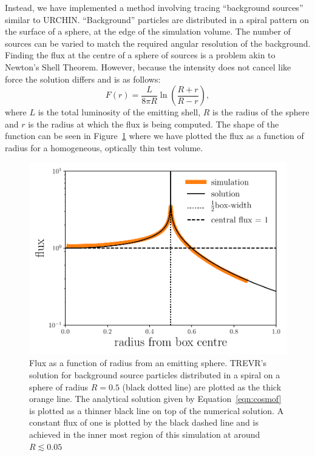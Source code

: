 \documentclass[fleq,usenatbib]{mnras}
\newcommand{\acro}{TREVR}
\begin{document}
{Instead, we have implemented a method involving tracing ``background sources'' 
similar to URCHIN. ``Background'' particles are distributed in a spiral 
pattern on the surface of a sphere, at the edge of the simulation volume. The number of 
sources can be varied to match the required angular resolution of the 
background. Finding the flux at the centre of a sphere of sources is a problem 
akin to Newton's Shell Theorem. However, because the intensity does not cancel 
like force the solution differs and is as follows:
\begin{equation}
\label{eqn:cosmof}
F(r) = \frac{L}{8\pi R} \ln \left(\frac{R+r}{R-r}\right),
\end{equation}
where $L$ is the total luminosity of the emitting shell, $R$ is the radius of 
the sphere and $r$ is the radius at which the flux is being computed. The 
shape of the function can be seen in Figure~\ref{fig:cosmof} where we have 
plotted the flux as a function of radius for a homogeneous, optically thin 
test volume.
\begin{figure}
\includegraphics[width=1\linewidth]{Figures/cosmofield.pdf}
\caption{Flux as a function of radius from an emitting sphere. \acro{}'s 
solution for background source particles distributed in a spiral on a sphere 
of radius $R=0.5$ (black dotted line) are plotted as the thick orange line. 
The analytical solution given by Equation~\ref{eqn:cosmof} is plotted as a 
thinner black line on top of the numerical solution. A constant flux of one is 
plotted by the black dashed line and is achieved in the inner most region of 
this simulation at around $R \lesssim 0.05$}
\label{fig:cosmof}
\end{figure}

}
\end{document}
